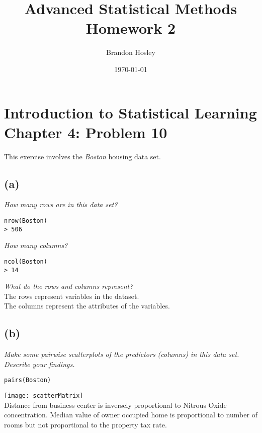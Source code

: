 \documentclass[a4paper,man,natbib]{apa6}
\title{Advanced Statistical Methods Homework 2}
\author{Brandon Hosley}
\date{\today}
\affiliation{University of Illinois - Springfield}
\begin{document}
\maketitle
\singlespacing

\section{Introduction to Statistical Learning \\ Chapter 4: Problem 10}
This exercise involves the \emph{Boston} housing data set.

\subsection{(a)} 
\emph{How many rows are in this data set?} \\
\begin{verbatim}
nrow(Boston)
> 506
\end{verbatim}
\emph{How many columns?}  \\
\begin{verbatim}
ncol(Boston)
> 14
\end{verbatim}
\emph{What do the rows and columns represent?} \\
The rows represent variables in the dataset. \\
The columns represent the attributes of the variables. \\

\subsection{(b)}
\emph{Make some pairwise scatterplots of the predictors (columns) in
this data set. Describe your findings.}
\begin{verbatim}
pairs(Boston)
\end{verbatim}
\texttt{[image: scatterMatrix]} \\
Distance from business center is inversely proportional to Nitrous Oxide concentration.
Median value of owner occupied home is proportional to number of rooms but not proportional to the property tax rate.
\end{document}

